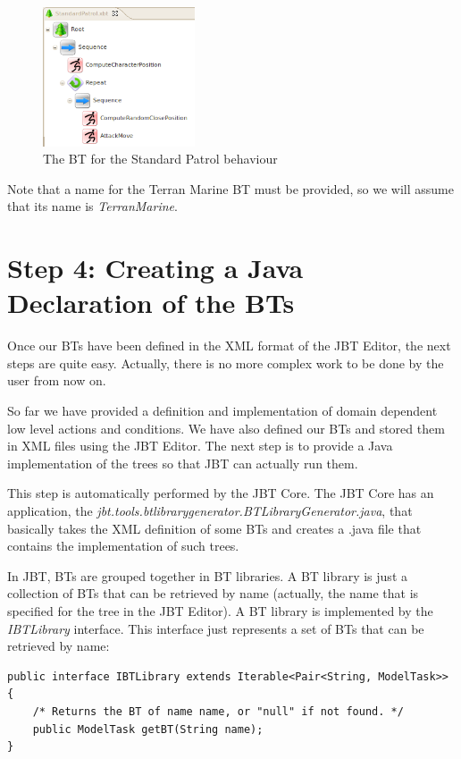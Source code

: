 \documentclass[a4paper]{article}
\begin{document}
\begin{figure}
 \centering
 \includegraphics[width=0.4\textwidth]{./Images/StandardPatrol.png}
 \caption{The BT for the Standard Patrol behaviour}
 \label{fig:StandardPatrol}
\end{figure}

Note that a name for the Terran Marine BT must be provided, so we will assume that its name is \textit{TerranMarine}.

\section{Step 4: Creating a Java Declaration of the BTs}

Once our BTs have been defined in the XML format of the JBT Editor, the next steps are quite easy. Actually, there is no more complex work to be done by the user from now on.

So far we have provided a definition and implementation of domain dependent low level actions and conditions. We have also defined our BTs and stored them in XML files using the JBT Editor. The next step is to provide a Java implementation of the trees so that JBT can actually run them.

This step is automatically performed by the JBT Core. The JBT Core has an application, the \textit{jbt.tools.btlibrarygenerator.BTLibraryGenerator.java}, that basically takes the XML definition of some BTs and creates a .java file that contains the implementation of such trees.

In JBT, BTs are grouped together in BT libraries. A BT library is just a collection of BTs that can be retrieved by name (actually, the name that is specified for the tree in the JBT Editor). A BT library is implemented by the \textit{IBTLibrary} interface. This interface just represents a set of BTs that can be retrieved by name:

\begin{verbatim}
public interface IBTLibrary extends Iterable<Pair<String, ModelTask>> {
    /* Returns the BT of name name, or "null" if not found. */
    public ModelTask getBT(String name);
}
\end{verbatim}
\end{document}
